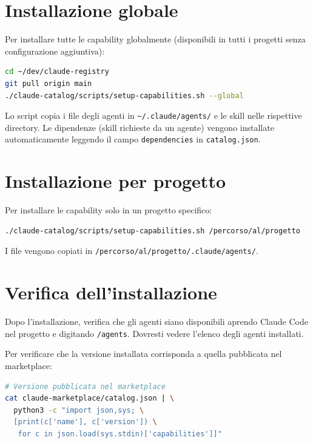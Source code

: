 \documentclass[12pt,a4paper,twoside]{book}
\begin{document}
\section{Installazione globale}

Per installare tutte le capability globalmente (disponibili in tutti i progetti senza configurazione aggiuntiva):

\begin{lstlisting}[language=bash]
cd ~/dev/claude-registry
git pull origin main
./claude-catalog/scripts/setup-capabilities.sh --global
\end{lstlisting}

Lo script copia i file degli agenti in \texttt{\textasciitilde/.claude/agents/} e le skill nelle rispettive directory. Le dipendenze (skill richieste da un agente) vengono installate automaticamente leggendo il campo \texttt{dependencies} in \texttt{catalog.json}.

\section{Installazione per progetto}

Per installare le capability solo in un progetto specifico:

\begin{lstlisting}[language=bash]
./claude-catalog/scripts/setup-capabilities.sh /percorso/al/progetto
\end{lstlisting}

I file vengono copiati in \texttt{/percorso/al/progetto/.claude/agents/}.

\section{Verifica dell'installazione}

Dopo l'installazione, verifica che gli agenti siano disponibili aprendo Claude Code nel progetto e digitando \texttt{/agents}. Dovresti vedere l'elenco degli agenti installati.

Per verificare che la versione installata corrisponda a quella pubblicata nel marketplace:

\begin{lstlisting}[language=bash]
# Versione pubblicata nel marketplace
cat claude-marketplace/catalog.json | \
  python3 -c "import json,sys; \
  [print(c['name'], c['version']) \
   for c in json.load(sys.stdin)['capabilities']]"
\end{lstlisting}
\end{document}
